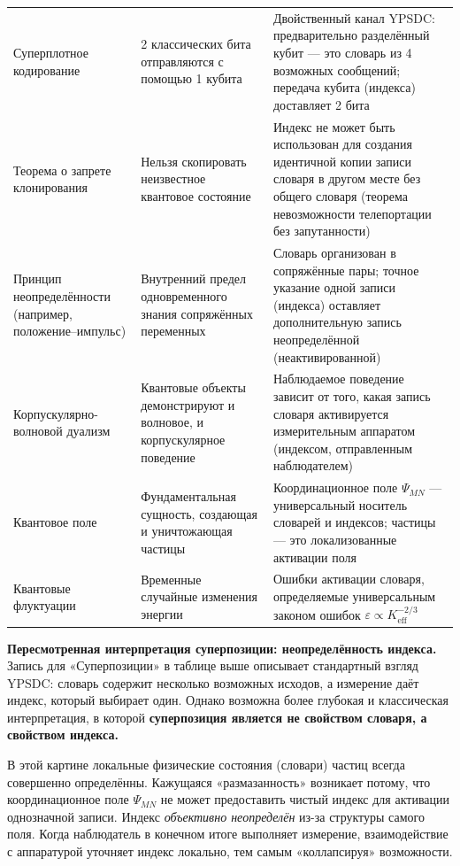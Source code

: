 \documentclass[12pt,a4paper]{article}
\theoremstyle{remark}
\begin{document}
\begin{longtable}{p{3.8cm} p{5cm} p{7cm}}
		Суперплотное кодирование &
		2 классических бита отправляются с помощью 1 кубита &
		Двойственный канал YPSDC: предварительно разделённый кубит — это словарь из 4 возможных сообщений; передача кубита (индекса) доставляет 2 бита \\
		\addlinespace
		
		Теорема о запрете клонирования &
		Нельзя скопировать неизвестное квантовое состояние &
		Индекс не может быть использован для создания идентичной копии записи словаря в другом месте без общего словаря (теорема невозможности телепортации без запутанности) \\
		\addlinespace
		
		Принцип неопределённости (например, положение–импульс) &
		Внутренний предел одновременного знания сопряжённых переменных &
		Словарь организован в сопряжённые пары; точное указание одной записи (индекса) оставляет дополнительную запись неопределённой (неактивированной) \\
		\addlinespace
		
		Корпускулярно-волновой дуализм &
		Квантовые объекты демонстрируют и волновое, и корпускулярное поведение &
		Наблюдаемое поведение зависит от того, какая запись словаря активируется измерительным аппаратом (индексом, отправленным наблюдателем) \\
		\addlinespace
		
		Квантовое поле &
		Фундаментальная сущность, создающая и уничтожающая частицы &
		Координационное поле \(\Psi_{MN}\) — универсальный носитель словарей и индексов; частицы — это локализованные активации поля \\
		\addlinespace
		
		Квантовые флуктуации &
		Временные случайные изменения энергии &
		Ошибки активации словаря, определяемые универсальным законом ошибок \(\varepsilon \propto K_{\mathrm{eff}}^{-2/3}\) \\
	\end{longtable}
	
	\noindent
	\textbf{Пересмотренная интерпретация суперпозиции: неопределённость индекса.}
	Запись для «Суперпозиции» в таблице выше описывает стандартный взгляд YPSDC: словарь содержит несколько возможных исходов, а измерение даёт индекс, который выбирает один. Однако возможна более глубокая и классическая интерпретация, в которой \textbf{суперпозиция является не свойством словаря, а свойством индекса.}
	
	В этой картине локальные физические состояния (словари) частиц всегда совершенно определённы. Кажущаяся «размазанность» возникает потому, что координационное поле \(\Psi_{MN}\) не может предоставить чистый индекс для активации однозначной записи. Индекс \emph{объективно неопределён} из-за структуры самого поля. Когда наблюдатель в конечном итоге выполняет измерение, взаимодействие с аппаратурой уточняет индекс локально, тем самым «коллапсируя» возможности.
	
\end{document}
